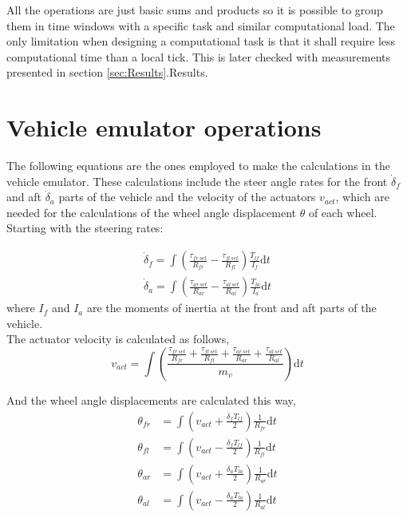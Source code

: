 \documentclass[table,xcdraw]{article}
\begin{document}
All the operations are just basic sums and products so it is possible to group them in time windows with a specific task and similar computational load. The only limitation when designing a computational task is that it shall require less computational time than a local tick. This is later checked with measurements presented in section \ref{sec:Results}.Results.


\newpage
\section{Vehicle emulator operations}\label{app:vehicle_emulator_operations}
The following equations are the ones employed to make the calculations in the vehicle emulator. These calculations include the steer angle rates for the front $\dot{\delta}_f$ and aft $\dot{\delta}_a$ parts of the vehicle and the velocity of the actuators $v_{act}$, which are needed for the calculations of the wheel angle displacement $\theta$ of each wheel. Starting with the steering rates:

\begin{equation}
    \begin{split}
        \dot{\delta}_f = \int{\left( \frac{\tau_{fr\, set}}{R_{fr}} - \frac{\tau_{fl\, set}}{R_{fl}} \right) \frac{T_{lf}}{I_f} \textrm{d}t}\\
        \dot{\delta}_a = \int{\left( \frac{\tau_{ar\, set}}{R_{ar}} - \frac{\tau_{al\, set}}{R_{al}} \right) \frac{T_{la}}{I_a} \textrm{d}t}
    \end{split}
\end{equation}
where $I_f$ and $I_a$ are the moments of inertia at the front and aft parts of the vehicle.\\

The actuator velocity is calculated as follows,
\begin{equation}
    v_{act} = \int{ \left( \frac{\frac{\tau_{fr\, set}}{R_{fr}} + \frac{\tau_{fl\, set}}{R_{fl}} + \frac{\tau_{ar\, set}}{R_{ar}} + \frac{\tau_{al\, set}}{R_{al}}}{m_v} \right) \textrm{d}t}
\end{equation}

And the wheel angle displacements are calculated this way,
\begin{equation}
    \begin{split}
        \theta_{fr} & = \int{\left( v_{act} + \frac{\dot{\delta}_f T_{lf}}{2} \right) \frac{1}{R_{fr}} \textrm{d}t}\\
        \theta_{fl} & = \int{\left( v_{act} - \frac{\dot{\delta}_f T_{lf}}{2} \right) \frac{1}{R_{fl}} \textrm{d}t}\\
        \theta_{ar} & = \int{\left( v_{act} + \frac{\dot{\delta}_a T_{la}}{2} \right) \frac{1}{R_{ar}} \textrm{d}t}\\
        \theta_{al} & = \int{\left( v_{act} - \frac{\dot{\delta}_a T_{la}}{2} \right) \frac{1}{R_{al}} \textrm{d}t}
    \end{split}
\end{equation}
\end{document}
